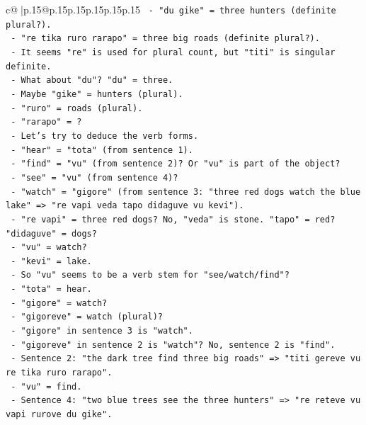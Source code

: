 \documentclass{article}
\begin{document}
{\begin{supertabular}{c@{$\;$}|p{.15\linewidth}@{}p{.15\linewidth}p{.15\linewidth}p{.15\linewidth}p{.15\linewidth}p{.15\linewidth}}
{{{\texttt{            {-} "du gike" = three hunters (definite plural?).} \\
\texttt{            {-} "re tika ruro rarapo" = three big roads (definite plural?).} \\
\texttt{            {-} It seems "re" is used for plural count, but "titi" is singular definite.} \\
\texttt{            {-} What about "du"? "du" = three.} \\
\texttt{            {-} Maybe "gike" = hunters (plural).} \\
\texttt{            {-} "ruro" = roads (plural).} \\
\texttt{            {-} "rarapo" = ?} \\
\texttt{      {-} Let's try to deduce the verb forms.} \\
\texttt{        {-} "hear" = "tota" (from sentence 1).} \\
\texttt{        {-} "find" = "vu" (from sentence 2)? Or "vu" is part of the object?} \\
\texttt{        {-} "see" = "vu" (from sentence 4)?} \\
\texttt{        {-} "watch" = "gigore" (from sentence 3: "three red dogs watch the blue lake" => "re vapi veda tapo didaguve vu kevi").} \\
\texttt{          {-} "re vapi" = three red dogs? No, "veda" is stone. "tapo" = red? "didaguve" = dogs?} \\
\texttt{          {-} "vu" = watch?} \\
\texttt{          {-} "kevi" = lake.} \\
\texttt{          {-} So "vu" seems to be a verb stem for "see/watch/find"?} \\
\texttt{          {-} "tota" = hear.} \\
\texttt{          {-} "gigore" = watch?} \\
\texttt{          {-} "gigoreve" = watch (plural)?} \\
\texttt{          {-} "gigore" in sentence 3 is "watch".} \\
\texttt{          {-} "gigoreve" in sentence 2 is "watch"? No, sentence 2 is "find".} \\
\texttt{          {-} Sentence 2: "the dark tree find three big roads" => "titi gereve vu re tika ruro rarapo".} \\
\texttt{            {-} "vu" = find.} \\
\texttt{          {-} Sentence 4: "two blue trees see the three hunters" => "re reteve vu vapi rurove du gike".} \\
}}}
\end{supertabular}}
\end{document}
